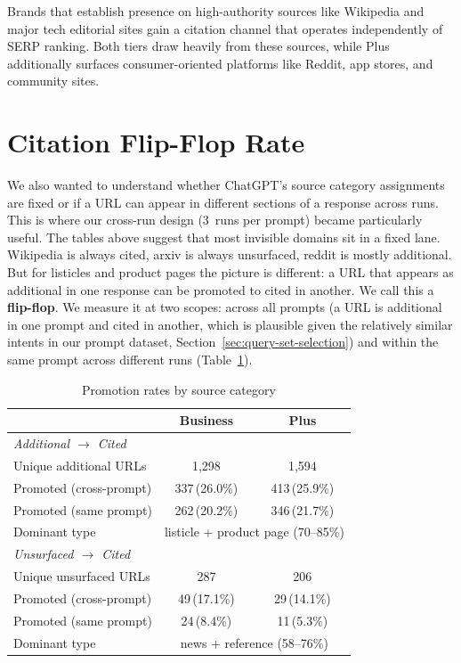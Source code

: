 Brands that establish presence on high-authority sources like
Wikipedia and major tech editorial sites gain a citation channel
that operates independently of SERP ranking. Both tiers draw
heavily from these sources, while Plus additionally surfaces
consumer-oriented platforms like Reddit, app stores, and community
sites.

\section{Citation Flip-Flop Rate}
\label{sec:flip-flop}

We also wanted to understand whether ChatGPT's source category assignments 
are fixed or if a URL can appear in different sections of a response across runs.
This is where our cross-run design (3~runs per prompt) became
particularly useful.
The tables above suggest that most invisible domains sit in a
fixed lane. Wikipedia is always cited, arxiv is
always unsurfaced, reddit is mostly additional. But for listicles
and product pages the picture is different: a URL that appears as
additional in one response can be promoted to cited in another.
We call this a \textbf{flip-flop}. We measure it at two scopes:
across all prompts (a URL is additional in one prompt and cited
in another, which is plausible given the relatively similar
intents in our prompt dataset, Section~\ref{sec:query-set-selection}) and within the same prompt across
different runs (Table~\ref{tab:flipflop-cross}).

\begin{table}[H]
\centering
\caption{Promotion rates by source category}
\label{tab:flipflop-cross}
\begin{tabular}{lcc}
\toprule
& \textbf{Business} & \textbf{Plus} \\
\midrule
\multicolumn{3}{l}{\textit{Additional $\to$ Cited}} \\
Unique additional URLs & 1{,}298 & 1{,}594 \\
Promoted (cross-prompt) & 337\,(26.0\%) & 413\,(25.9\%) \\
Promoted (same prompt) & 262\,(20.2\%) & 346\,(21.7\%) \\
Dominant type & \multicolumn{2}{c}{listicle + product page (70--85\%)} \\
\midrule
\multicolumn{3}{l}{\textit{Unsurfaced $\to$ Cited}} \\
Unique unsurfaced URLs & 287 & 206 \\
Promoted (cross-prompt) & 49\,(17.1\%) & 29\,(14.1\%) \\
Promoted (same prompt) & 24\,(8.4\%) & 11\,(5.3\%) \\
Dominant type & \multicolumn{2}{c}{news + reference (58--76\%)} \\
\bottomrule
\end{tabular}
\end{table}

